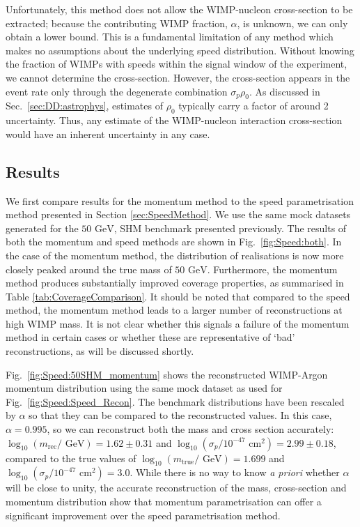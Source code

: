 Unfortunately, this method does not allow the WIMP-nucleon cross-section to be extracted; because the contributing WIMP fraction, \(\alpha\), is unknown, we can only obtain a lower bound. This is a fundamental limitation of any method which makes no assumptions about the underlying speed distribution. Without knowing the fraction of WIMPs with speeds within the signal window of the experiment, we cannot determine the cross-section. However, the cross-section appears in the event rate only through the degenerate combination \(\sigma_p \rho_0\). As discussed in Sec.~\ref{sec:DD:astrophys}, estimates of $\rho_0$ typically carry a factor of around 2 uncertainty. Thus, any estimate of the WIMP-nucleon interaction cross-section would have an inherent uncertainty in any case.

\subsection{Results}

We first compare results for the momentum method to the speed parametrisation method presented in Section \ref{sec:SpeedMethod}. We use the same mock datasets generated for the \(50 \textrm{ GeV}\), SHM benchmark presented previously. The results of both the momentum and speed methods are shown in Fig.\ \ref{fig:Speed:both}. In the case of the momentum method, the distribution of realisations is now more closely peaked around the true mass of \(50 \textrm{ GeV}\). Furthermore, the momentum method produces substantially improved coverage properties, as summarised in Table \ref{tab:CoverageComparison}. It should be noted that compared to the speed method, the momentum method leads to a larger number of reconstructions at high WIMP mass. It is not clear whether this signals a failure of the momentum method in certain cases or whether these are representative of `bad' reconstructions, as will be discussed shortly. 

Fig.\ \ref{fig:Speed:50SHM_momentum} shows the reconstructed WIMP-Argon momentum distribution using the same mock dataset as used for Fig.\ \ref{fig:Speed:Speed_Recon}. The benchmark distributions have been rescaled by \(\alpha\) so that they can be compared to the reconstructed values. In this case, \(\alpha = 0.995\), so we can reconstruct both the mass and cross section accurately: \(\log_{10} (m_\textrm{rec} / \textrm{ GeV}) = 1.62 \pm 0.31\) and \(\log_{10} (\sigma_p / 10^{-47} \textrm{ cm}^2) = 2.99 \pm 0.18\), compared to the true values of \(\log_{10} (m_\textrm{true} / \textrm{ GeV}) = 1.699\) and \(\log_{10} (\sigma_p / 10^{-47} \textrm{ cm}^2) = 3.0\). While there is no way to know \textit{a priori} whether \(\alpha\) will be close to unity, the accurate reconstruction of the mass, cross-section and momentum distribution show that momentum parametrisation can offer a significant improvement over the speed parametrisation method.

